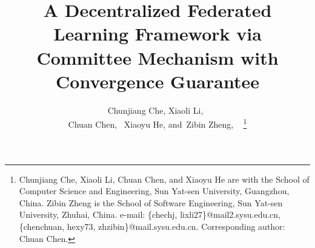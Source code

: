 \documentclass[10pt,journal,compsoc]{IEEEtran}
\begin{document}
%
\title{A Decentralized Federated Learning Framework via Committee Mechanism with Convergence Guarantee}
%
%
%
%

\author{Chunjiang Che,
 Xiaoli Li,~ \\
 Chuan Chen,~
 Xiaoyu He,
 and~Zibin Zheng, ~%
 \thanks{Chunjiang Che, Xiaoli Li, Chuan Chen, and Xiaoyu He are with the School of Computer Science and Engineering, Sun Yat-sen University, Guangzhou, China. Zibin Zheng is the School of Software Engineering, Sun Yat-sen University, Zhuhai, China. e-mail: \{chechj, lixli27\}@mail2.sysu.edu.cn, \{chenchuan,
hexy73, zhzibin\}@mail.sysu.edu.cn.
 Corresponding author: Chuan Chen.}%
}
\end{document}
